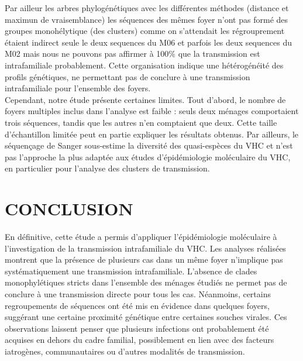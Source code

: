 \documentclass[a4paper,12pt]{article}
\begin{document}
Par ailleur les arbres phylogénétiques avec les différentes méthodes (distance et maximun de vraisemblance) les séquences des mêmes foyer n'ont pas formé  des groupes monohélytique (des clusters) comme on s'attendait les régrouprement étaient indirect seule le deux sequences du M06  et parfois les deux sequences du M02 mais nous ne pouvons pas affirmer à 100\% que la transmission est intrafamiliale probablement.
Cette organisation indique une hétérogénéité des profils génétiques, ne permettant pas de conclure à une transmission intrafamiliale pour l’ensemble des foyers. \\

Cependant, notre étude présente certaines limites. Tout d’abord, le nombre de foyers multiples inclus dans l’analyse est faible : seuls deux ménages comportaient trois séquences, tandis que les autres n’en comptaient que deux. Cette taille d’échantillon limitée peut en partie expliquer les résultats obtenus. Par ailleurs, le séquençage de Sanger sous-estime la diversité des quasi-espèces du VHC et n’est pas l’approche la plus adaptée aux études d’épidémiologie moléculaire du VHC, en particulier pour l’analyse des clusters de transmission.

\newpage 
\section*{CONCLUSION}

En définitive, cette étude a permis d’appliquer l’épidémiologie moléculaire à l’investigation de la transmission intrafamiliale du VHC. Les analyses réalisées montrent que la présence de plusieurs cas dans un même foyer n’implique pas systématiquement une transmission intrafamiliale. L’absence de clades monophylétiques stricts dans l’ensemble des ménages étudiés ne permet pas de conclure à une transmission directe pour tous les cas. Néanmoins, certains regroupements de séquences ont été mis en évidence dans quelques foyers, suggérant une certaine proximité génétique entre certaines souches virales. Ces observations laissent penser que plusieurs infections ont probablement été acquises en dehors du cadre familial, possiblement en lien avec des facteurs iatrogènes, communautaires ou d’autres modalités de transmission.\\









\newpage 

\setcounter{page}{4}

\printbibliography
\end{document}
